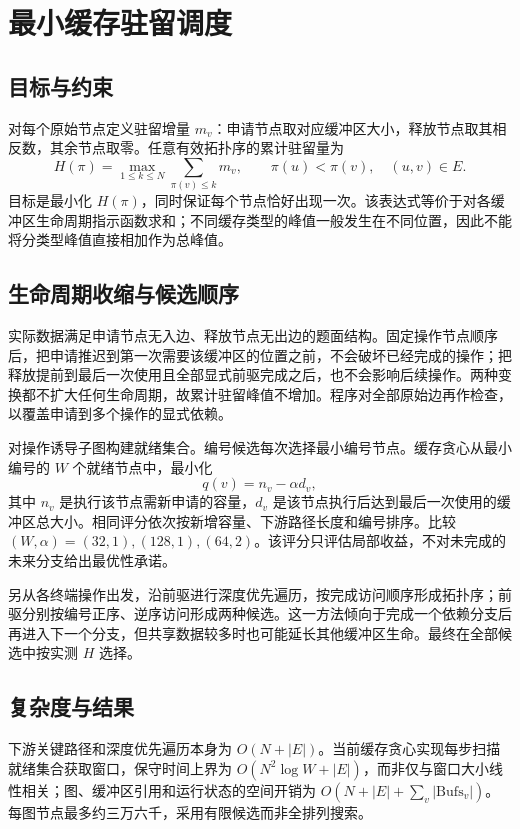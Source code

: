 \section{最小缓存驻留调度}
\subsection{目标与约束}
对每个原始节点定义驻留增量 $m_v$：申请节点取对应缓冲区大小，释放节点取其相反数，其余节点取零。任意有效拓扑序的累计驻留量为
\begin{equation}
H(\pi)=\max_{1\le k\le N}\sum_{\pi(v)\le k}m_v,
\qquad \pi(u)<\pi(v),\quad (u,v)\in E.
\end{equation}
目标是最小化 $H(\pi)$，同时保证每个节点恰好出现一次。该表达式等价于对各缓冲区生命周期指示函数求和；不同缓存类型的峰值一般发生在不同位置，因此不能将分类型峰值直接相加作为总峰值。

\subsection{生命周期收缩与候选顺序}
实际数据满足申请节点无入边、释放节点无出边的题面结构。固定操作节点顺序后，把申请推迟到第一次需要该缓冲区的位置之前，不会破坏已经完成的操作；把释放提前到最后一次使用且全部显式前驱完成之后，也不会影响后续操作。两种变换都不扩大任何生命周期，故累计驻留峰值不增加。程序对全部原始边再作检查，以覆盖申请到多个操作的显式依赖。

对操作诱导子图构建就绪集合。编号候选每次选择最小编号节点。缓存贪心从最小编号的 $W$ 个就绪节点中，最小化
\begin{equation}q(v)=n_v-\alpha d_v,\end{equation}
其中 $n_v$ 是执行该节点需新申请的容量，$d_v$ 是该节点执行后达到最后一次使用的缓冲区总大小。相同评分依次按新增容量、下游路径长度和编号排序。比较 $(W,\alpha)=(32,1),(128,1),(64,2)$。该评分只评估局部收益，不对未完成的未来分支给出最优性承诺。

另从各终端操作出发，沿前驱进行深度优先遍历，按完成访问顺序形成拓扑序；前驱分别按编号正序、逆序访问形成两种候选。这一方法倾向于完成一个依赖分支后再进入下一个分支，但共享数据较多时也可能延长其他缓冲区生命。最终在全部候选中按实测 $H$ 选择。

\subsection{复杂度与结果}
下游关键路径和深度优先遍历本身为 $O(N+|E|)$。当前缓存贪心实现每步扫描就绪集合获取窗口，保守时间上界为 $O(N^2\log W+|E|)$，而非仅与窗口大小线性相关；图、缓冲区引用和运行状态的空间开销为 $O(N+|E|+\sum_v|\mathrm{Bufs}_v|)$。每图节点最多约三万六千，采用有限候选而非全排列搜索。

